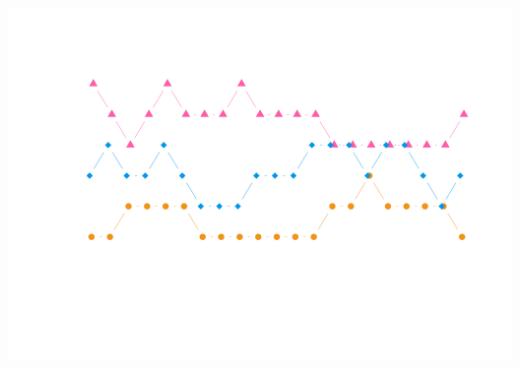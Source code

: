\documentclass{article}\usepackage[]{graphicx}\usepackage[]{color}
\newenvironment{knitrout}{}{} %
\begin{document}
\begin{knitrout}
\includegraphics[width=\textwidth]{figure/dice2-4} 

\end{knitrout}
\end{document}
